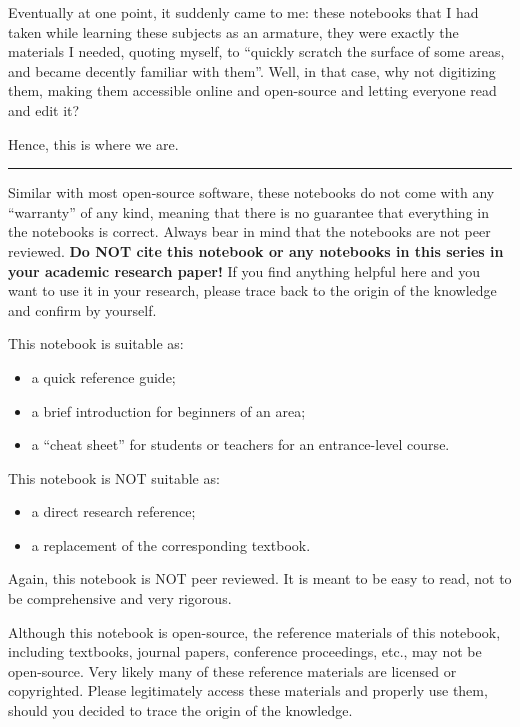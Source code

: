 Eventually at one point, it suddenly came to me: these notebooks that I had taken while learning these subjects as an armature, they were exactly the materials I needed, quoting myself, to ``quickly scratch the surface of some areas, and became decently familiar with them''. Well, in that case, why not digitizing them, making them accessible online and open-source and letting everyone read and edit it? 

Hence, this is where we are.

\vspace{0.1in}
\noindent \rule{1in}{0.4pt}
\vspace{0.1in}

Similar with most open-source software, these notebooks do not come with any ``warranty'' of any kind, meaning that there is no guarantee that everything in the notebooks is correct. Always bear in mind that the notebooks are not peer reviewed. \textbf{Do NOT cite this notebook or any notebooks in this series in your academic research paper!} If you find anything helpful here and you want to use it in your research, please trace back to the origin of the knowledge and confirm by yourself.

\vspace{0.1in}

This notebook is suitable as:
\begin{itemize}
  \item a quick reference guide;
  \item a brief introduction for beginners of an area;
  \item a ``cheat sheet'' for students or teachers for an entrance-level course.
\end{itemize}

This notebook is NOT suitable as:
\begin{itemize}
  \item a direct research reference;
  \item a replacement of the corresponding textbook.
\end{itemize}

Again, this notebook is NOT peer reviewed. It is meant to be easy to read, not to be comprehensive and very rigorous.

Although this notebook is open-source, the reference materials of this notebook, including textbooks, journal papers, conference proceedings, etc., may not be open-source. Very likely many of these reference materials are licensed or copyrighted. Please legitimately access these materials and properly use them, should you decided to trace the origin of the knowledge.

